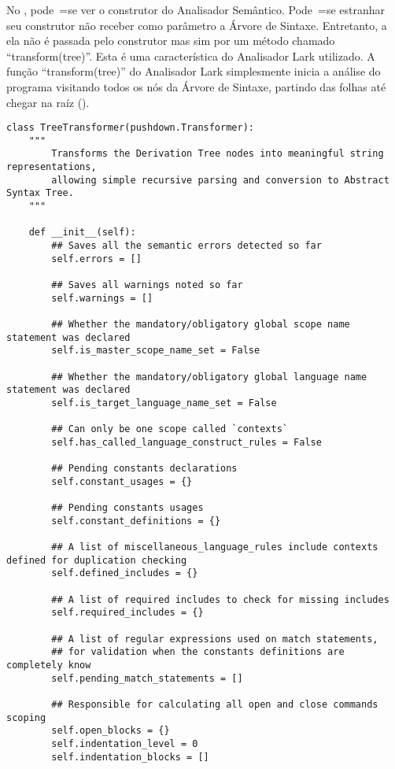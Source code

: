 No ,
pode~=se ver o construtor do Analisador Semântico.
Pode~=se estranhar seu construtor não receber como parâmetro a Árvore de Sintaxe.
Entretanto,
a ela não é passada pelo construtor mas sim por um método chamado ``transform(tree)''.
Esta é uma característica do Analisador Lark utilizado.
A função ``transform(tree)'' do Analisador Lark simplesmente inicia a análise do programa visitando todos os nós da Árvore de Sintaxe,
partindo das folhas até chegar na raíz ().
\begin{lstlisting}[caption={Construtor do Analisador Semântico},label={semanticAnalizerConstructor},style=mypython]
class TreeTransformer(pushdown.Transformer):
    """
        Transforms the Derivation Tree nodes into meaningful string representations,
        allowing simple recursive parsing and conversion to Abstract Syntax Tree.
    """

    def __init__(self):
        ## Saves all the semantic errors detected so far
        self.errors = []

        ## Saves all warnings noted so far
        self.warnings = []

        ## Whether the mandatory/obligatory global scope name statement was declared
        self.is_master_scope_name_set = False

        ## Whether the mandatory/obligatory global language name statement was declared
        self.is_target_language_name_set = False

        ## Can only be one scope called `contexts`
        self.has_called_language_construct_rules = False

        ## Pending constants declarations
        self.constant_usages = {}

        ## Pending constants usages
        self.constant_definitions = {}

        ## A list of miscellaneous_language_rules include contexts defined for duplication checking
        self.defined_includes = {}

        ## A list of required includes to check for missing includes
        self.required_includes = {}

        ## A list of regular expressions used on match statements,
        ## for validation when the constants definitions are completely know
        self.pending_match_statements = []

        ## Responsible for calculating all open and close commands scoping
        self.open_blocks = {}
        self.indentation_level = 0
        self.indentation_blocks = []
\end{lstlisting}

